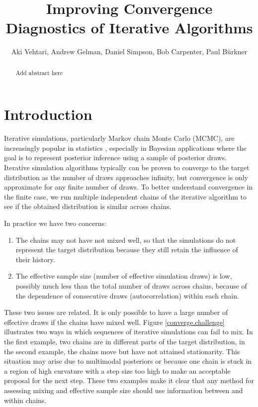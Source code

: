 \documentclass[american,]{article}
\title{Improving Convergence Diagnostics of Iterative Algorithms}
\author{Aki Vehtari, Andrew Gelman, Daniel Simpson, Bob Carpenter, Paul Bürkner}
\date{}
\begin{document}
\maketitle
\begin{abstract}
Add abstract here
\end{abstract}

\hypertarget{introduction}{%
\section{Introduction}\label{introduction}}

Iterative simulations, particularly Markov chain Monte Carlo (MCMC), are 
increasingly popular in statistics \citep{Brooks+Gelman:1998},
especially in Bayesian applications where the goal is to represent
posterior inference using a sample of posterior draws. Iterative
simulation algorithms typically can be proven to converge
to the target distribution as the number of draws approaches infinity,
but convergence is only approximate for any finite number of draws. To better 
understand convergence in the finite case, we run multiple 
independent chains of the iterative algorithm to see if the obtained 
distribution is similar across chains.

In practice we have two concerns:

\begin{enumerate}
\item The chains may not have not mixed well, so that the simulations do not
represent the target distribution because they still retain the influence of
their history.
\item The effective sample size (number of effective simulation draws) is low,
possibly much less than the total number of draws across chains, because
of the dependence of consecutive draws (autocorrelation) within each chain.
\end{enumerate}

These two issues are related. It is only possible to have a large number
of effective draws if the chains have mixed well. Figure
\ref{converge.challenge} illustrates two ways in which sequences of
iterative simulations can fail to mix. In the first example, two chains
are in different parts of the target distribution, in the second
example, the chains move but have not attained stationarity. This
situation may arise due to multimodal posteriors or because one chain is
stuck in a region of high curvature with a step size too high to make an
acceptable proposal for the next step. These two examples make it clear that 
any method for assessing mixing and effective sample size should use information
between and within chains.
\end{document}
